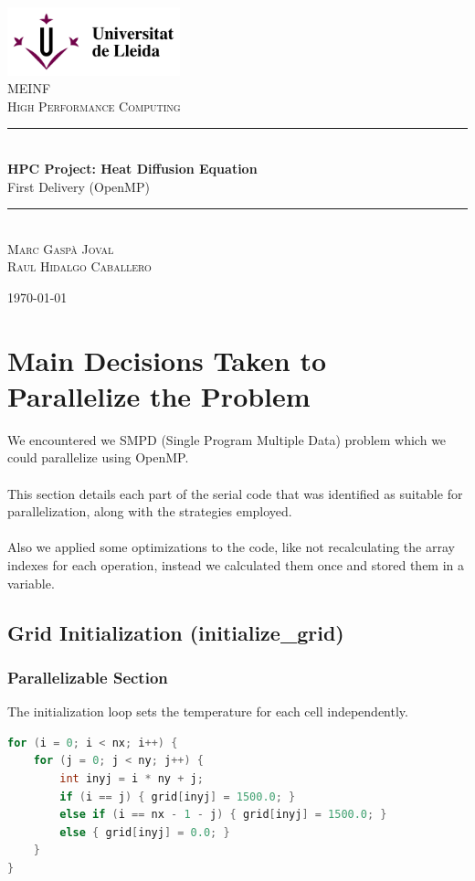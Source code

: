 \documentclass[12pt]{article}
\begin{document}
\begin{titlepage}
	\newcommand{\HRule}{\rule{\linewidth}{0.5mm}}

	\center

	\includegraphics[width=5cm]{logoudl.png}\\
	\textsc{\Large MEINF}\\[0.5cm]
	\textsc{\large High Performance Computing}\\[0.5cm]

	\HRule\\[0.4cm]

	{\huge\bfseries HPC Project: Heat Diffusion Equation}\\[0.4cm]
	{\LARGE First Delivery (OpenMP)}
	\HRule\\[1.5cm]

	\textsc{Marc Gaspà Joval\\Raul Hidalgo Caballero}

	\vfill\vfill\vfill
	{\large\today}
\end{titlepage}
\pagebreak
\thispagestyle{empty}
\tableofcontents
\pagebreak
\thispagestyle{empty}
\listoftables
\pagebreak

\section{Main Decisions Taken to Parallelize the Problem}

We encountered we SMPD (Single Program Multiple Data) problem which we could parallelize using OpenMP.
\\\\
This section details each part of the serial code that was identified as suitable for parallelization, along with the strategies employed.
\\\\
Also we applied some optimizations to the code, like not recalculating the array indexes for each operation, instead we calculated them once and stored them in a variable.

\subsection{Grid Initialization (initialize\_grid)}

\subsubsection{Parallelizable Section}
The initialization loop sets the temperature for each cell independently.
\begin{lstlisting}[language=C, basicstyle=\scriptsize\ttfamily]
for (i = 0; i < nx; i++) {
	for (j = 0; j < ny; j++) {
		int inyj = i * ny + j;
		if (i == j) { grid[inyj] = 1500.0; }
		else if (i == nx - 1 - j) { grid[inyj] = 1500.0; }
		else { grid[inyj] = 0.0; }
	}
}
\end{lstlisting}
\end{document}
